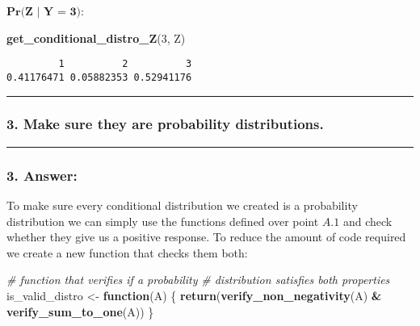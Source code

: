 \documentclass[
]{article}
\newenvironment{Shaded}{\begin{snugshade}}{\end{snugshade}}
\newcommand{\CommentTok}[1]{\textcolor[rgb]{0.56,0.35,0.01}{\textit{#1}}}
\newcommand{\ControlFlowTok}[1]{\textcolor[rgb]{0.13,0.29,0.53}{\textbf{#1}}}
\newcommand{\DecValTok}[1]{\textcolor[rgb]{0.00,0.00,0.81}{#1}}
\newcommand{\FunctionTok}[1]{\textcolor[rgb]{0.13,0.29,0.53}{\textbf{#1}}}
\newcommand{\NormalTok}[1]{#1}
\newcommand{\OtherTok}[1]{\textcolor[rgb]{0.56,0.35,0.01}{#1}}
\newcommand{\SpecialCharTok}[1]{\textcolor[rgb]{0.81,0.36,0.00}{\textbf{#1}}}
\begin{document}
\(\textbf{Pr(Z | Y = 3)}\):

\begin{Shaded}
\begin{Highlighting}[]
\FunctionTok{get\_conditional\_distro\_Z}\NormalTok{(}\DecValTok{3}\NormalTok{, Z)}
\end{Highlighting}
\end{Shaded}

\begin{verbatim}
         1          2          3 
0.41176471 0.05882353 0.52941176 
\end{verbatim}

\begin{center}\rule{0.5\linewidth}{0.5pt}\end{center}

\bigskip

\hypertarget{make-sure-they-are-probability-distributions.}{%
\subsubsection{3. Make sure they are probability
distributions.}\label{make-sure-they-are-probability-distributions.}}

\bigskip

\begin{center}\rule{0.5\linewidth}{0.5pt}\end{center}

\hypertarget{answer-2}{%
\subsubsection{3. Answer:}\label{answer-2}}

To make sure every conditional distribution we created is a probability
distribution we can simply use the functions defined over point \(A.1\)
and check whether they give us a positive response. To reduce the amount
of code required we create a new function that checks them both:

\begin{Shaded}
\begin{Highlighting}[]
\CommentTok{\# function that verifies if a probability}
\CommentTok{\# distribution satisfies both properties}
\NormalTok{is\_valid\_distro }\OtherTok{\textless{}{-}} \ControlFlowTok{function}\NormalTok{(A) \{}
    \FunctionTok{return}\NormalTok{(}\FunctionTok{verify\_non\_negativity}\NormalTok{(A) }\SpecialCharTok{\&} \FunctionTok{verify\_sum\_to\_one}\NormalTok{(A))}
\NormalTok{\}}
\end{Highlighting}
\end{Shaded}
\end{document}
